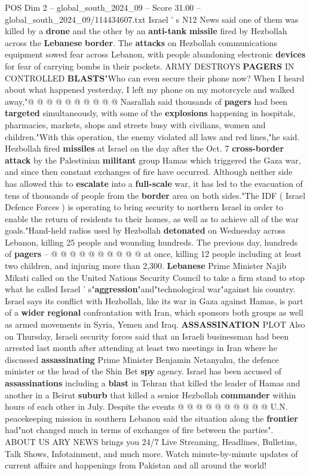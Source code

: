 \begin{textsample}{POS Dim 2 – global\_south\_2024\_09 – Score 31.00 – global\_south\_2024\_09/114434607.txt}
Israel ' s N12 News said one of them was killed by a \textbf{drone} and the other by an \textbf{anti-tank} \textbf{missile} fired by Hezbollah across the \textbf{Lebanese} \textbf{border}.
The \textbf{attacks} on Hezbollah communications equipment sowed fear across Lebanon, with people abandoning electronic \textbf{devices} for fear of carrying bombs in their pockets.
ARMY DESTROYS \textbf{PAGERS} IN CONTROLLED \textbf{BLASTS}"Who can even secure their phone now?
When I heard about what happened yesterday, I left my phone on my motorcycle and walked away,"@ @ @ @ @ @ @ @ @ @ Nasrallah said thousands of \textbf{pagers} had been \textbf{targeted} simultaneously, with some of the \textbf{explosions} happening in hospitals, pharmacies, markets, shops and streets busy with civilians, women and children."With this operation, the enemy violated all laws and red lines,"he said.
Hezbollah fired \textbf{missiles} at Israel on the day after the Oct. 7 \textbf{cross-border} \textbf{attack} by the Palestinian \textbf{militant} group Hamas which triggered the Gaza war, and since then constant exchanges of fire have occurred.
Although neither side has allowed this to \textbf{escalate} into a \textbf{full-scale} war, it has led to the evacuation of tens of thousands of people from the \textbf{border} area on both sides."The IDF ( Israel Defence Forces ) is operating to bring security to northern Israel in order to enable the return of residents to their homes, as well as to achieve all of the war goals."Hand-held radios used by Hezbollah \textbf{detonated} on Wednesday across Lebanon, killing 25 people and wounding hundreds.
The previous day, hundreds of \textbf{pagers} -- @ @ @ @ @ @ @ @ @ @ at once, killing 12 people including at least two children, and injuring more than 2,300. \textbf{Lebanese} Prime Minister Najib Mikati called on the United Nations Security Council to take a firm stand to stop what he called Israel ' s"\textbf{aggression}"and"technological war"against his country.
Israel says its conflict with Hezbollah, like its war in Gaza against Hamas, is part of a \textbf{wider} \textbf{regional} confrontation with Iran, which sponsors both groups as well as armed movements in Syria, Yemen and Iraq. \textbf{ASSASSINATION} PLOT Also on Thursday, Israeli security forces said that an Israeli businessman had been arrested last month after attending at least two meetings in Iran where he discussed \textbf{assassinating} Prime Minister Benjamin Netanyahu, the defence minister or the head of the Shin Bet \textbf{spy} agency.
Israel has been accused of \textbf{assassinations} including a \textbf{blast} in Tehran that killed the leader of Hamas and another in a Beirut \textbf{suburb} that killed a senior Hezbollah \textbf{commander} within hours of each other in July.
Despite the events @ @ @ @ @ @ @ @ @ @ U.N. peacekeeping mission in southern Lebanon said the situation along the \textbf{frontier} had"not changed much in terms of exchanges of fire between the parties".
ABOUT US ARY NEWS brings you 24/7 Live Streaming, Headlines, Bulletins, Talk Shows, Infotainment, and much more.
Watch minute-by-minute updates of current affairs and happenings from Pakistan and all around the world!


\end{textsample}
